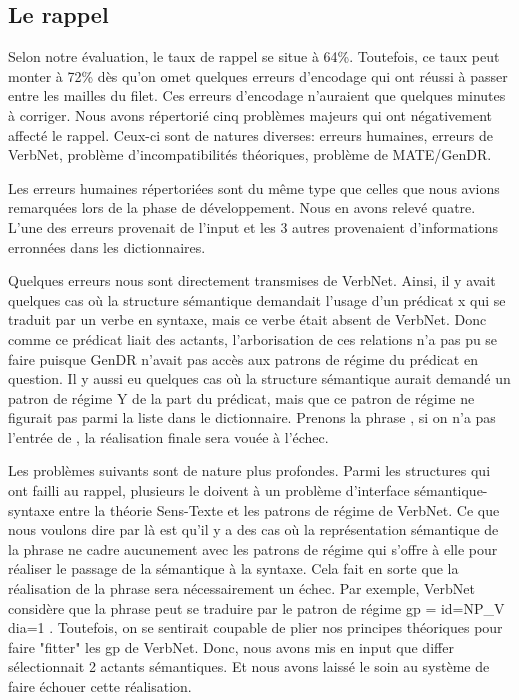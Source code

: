 \subsection{Le rappel}

Selon notre évaluation, le taux de rappel se situe à 64\%. Toutefois, ce taux peut monter à 72\% dès qu'on omet quelques erreurs d'encodage qui ont réussi à passer entre les mailles du filet. Ces erreurs d'encodage n'auraient que quelques minutes à corriger. Nous avons répertorié cinq problèmes majeurs qui ont négativement affecté le rappel. Ceux-ci sont de natures diverses: erreurs humaines, erreurs de VerbNet, problème d'incompatibilités théoriques, problème de MATE/GenDR.

Les erreurs humaines répertoriées sont du même type que celles que nous avions remarquées lors de la phase de développement. Nous en avons relevé quatre. L'une des erreurs provenait de l'input et les 3 autres provenaient d'informations erronnées dans les dictionnaires.

Quelques erreurs nous sont directement transmises de VerbNet. Ainsi, il y avait quelques cas où la structure sémantique demandait l'usage d'un prédicat x qui se traduit par un verbe en syntaxe, mais ce verbe était absent de VerbNet. Donc comme ce prédicat liait des actants, l'arborisation de ces relations n'a pas pu se faire puisque GenDR n'avait pas accès aux patrons de régime du prédicat en question. Il y aussi eu quelques cas où la structure sémantique aurait demandé un patron de régime Y de la part du prédicat, mais que ce patron de régime ne figurait pas parmi la liste dans le dictionnaire. Prenons la phrase , si on n'a pas l'entrée de , la réalisation finale sera vouée à l'échec.

Les problèmes suivants sont de nature plus profondes. Parmi les structures qui ont failli au rappel, plusieurs le doivent à un problème d'interface sémantique-syntaxe entre la théorie Sens-Texte et les patrons de régime de VerbNet. Ce que nous voulons dire par là est qu'il y a des cas où la représentation sémantique de la phrase ne cadre aucunement avec les patrons de régime qui s'offre à elle pour réaliser le passage de la sémantique à la syntaxe. Cela fait en sorte que la réalisation de la phrase sera nécessairement un échec. Par exemple, VerbNet considère que la phrase  peut se traduire par le patron de régime gp = { id=NP\_V dia=1 }. Toutefois, on se sentirait coupable de plier nos principes théoriques pour faire "fitter" les gp de VerbNet. Donc, nous avons mis en input que differ sélectionnait 2 actants sémantiques. Et nous avons laissé le soin au système de faire échouer cette réalisation. 

